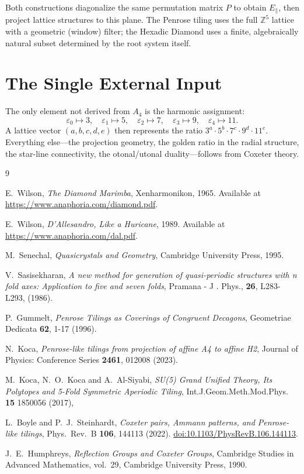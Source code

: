 \documentclass[11pt]{article}
\begin{document}
Both constructions diagonalize the same permutation matrix $P$ to obtain
$E_\parallel$, then project lattice structures to this plane. The Penrose
tiling uses the full $\mathbb{Z}^5$ lattice with a geometric (window) filter;
the Hexadic Diamond uses a finite, algebraically natural subset determined
by the root system itself.

\section{The Single External Input}

The only element not derived from $A_4$ is the harmonic assignment:
\[
  \varepsilon_0 \mapsto 3, \quad
  \varepsilon_1 \mapsto 5, \quad
  \varepsilon_2 \mapsto 7, \quad
  \varepsilon_3 \mapsto 9, \quad
  \varepsilon_4 \mapsto 11.
\]
A lattice vector $(a,b,c,d,e)$ then represents the ratio
$3^a \cdot 5^b \cdot 7^c \cdot 9^d \cdot 11^e$. Everything else---the
projection geometry, the golden ratio in the radial structure, the star-line
connectivity, the otonal/utonal duality---follows from Coxeter theory.

\begin{thebibliography}{9}

E.~Wilson,
\textit{The Diamond Marimba},
Xenharmonikon, 1965.
Available at \url{https://www.anaphoria.com/diamond.pdf}.

E.~Wilson,
\textit{D'Allesandro, Like a Huricane}, 1989.
Available at \url{https://www.anaphoria.com/dal.pdf}.

M.~Senechal,
\textit{Quasicrystals and Geometry},
Cambridge University Press, 1995.

V.~Sasisekharan,
\textit{A new method for generation of quasi-periodic structures with n fold axes: Application to five and seven folds},
Pramana - J . Phys., \textbf{26}, L283-L293, (1986).


P.~Gummelt,
\textit{Penrose Tilings as Coverings of Congruent Decagons},
Geometriae Dedicata \textbf{62}, 1-17 (1996).

N.~Koca,
\textit{Penrose-like tilings from projection of affine A4 to affine H2},
Journal of Physics: Conference Series \textbf{2461}, 012008 (2023).


M.~Koca, N.~O.~Koca and A.~Al-Siyabi,
\textit{SU(5) Grand Unified Theory, Its Polytopes and 5-Fold Symmetric Aperiodic Tiling},
Int.J.Geom.Meth.Mod.Phys. \textbf{15} 1850056 (2017), 


L.~Boyle and P.~J.~Steinhardt,
\textit{Coxeter pairs, Ammann patterns, and Penrose-like tilings},
Phys.\ Rev.\ B \textbf{106}, 144113 (2022).
\href{https://doi.org/10.1103/PhysRevB.106.144113}{doi:10.1103/PhysRevB.106.144113}.

J.~E.~Humphreys,
\textit{Reflection Groups and Coxeter Groups},
Cambridge Studies in Advanced Mathematics, vol.\ 29,
Cambridge University Press, 1990.

\end{thebibliography}
\end{document}
